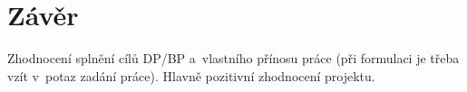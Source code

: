 \documentclass[11pt,twoside,a4paper]{book}
\begin{document}




















\chapter{Závěr}

Zhodnocení splnění cílů DP/BP a~vlastního přínosu práce (při formulaci je třeba vzít v~potaz zadání práce).
Hlavně pozitivní zhodnocení projektu.


%

\end{document}
